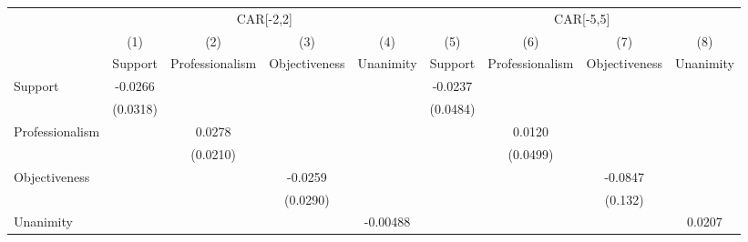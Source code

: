 {
\def\sym#1{\ifmmode^{#1}\else\(^{#1}\)\fi}
\begin{tabular}{l*{8}{c}}
\hline\hline
                    &\multicolumn{4}{c}{CAR[-2,2]}                                                          &\multicolumn{4}{c}{CAR[-5,5]}                                                          \\
                    &\multicolumn{1}{c}{(1)}&\multicolumn{1}{c}{(2)}&\multicolumn{1}{c}{(3)}&\multicolumn{1}{c}{(4)}&\multicolumn{1}{c}{(5)}&\multicolumn{1}{c}{(6)}&\multicolumn{1}{c}{(7)}&\multicolumn{1}{c}{(8)}\\
                    &\multicolumn{1}{c}{Support}&\multicolumn{1}{c}{Professionalism}&\multicolumn{1}{c}{Objectiveness}&\multicolumn{1}{c}{Unanimity}&\multicolumn{1}{c}{Support}&\multicolumn{1}{c}{Professionalism}&\multicolumn{1}{c}{Objectiveness}&\multicolumn{1}{c}{Unanimity}\\
\hline
Support             &     -0.0266         &                     &                     &                     &     -0.0237         &                     &                     &                     \\
                    &    (0.0318)         &                     &                     &                     &    (0.0484)         &                     &                     &                     \\
Professionalism     &                     &      0.0278         &                     &                     &                     &      0.0120         &                     &                     \\
                    &                     &    (0.0210)         &                     &                     &                     &    (0.0499)         &                     &                     \\
Objectiveness       &                     &                     &     -0.0259         &                     &                     &                     &     -0.0847         &                     \\
                    &                     &                     &    (0.0290)         &                     &                     &                     &     (0.132)         &                     \\
Unanimity           &                     &                     &                     &    -0.00488         &                     &                     &                     &      0.0207         \\

\end{tabular}}

